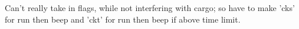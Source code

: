 

Can't really take in flags, while not interfering with cargo; so have to make
'cks' for run then beep and
'ckt' for run then beep if above time limit.
